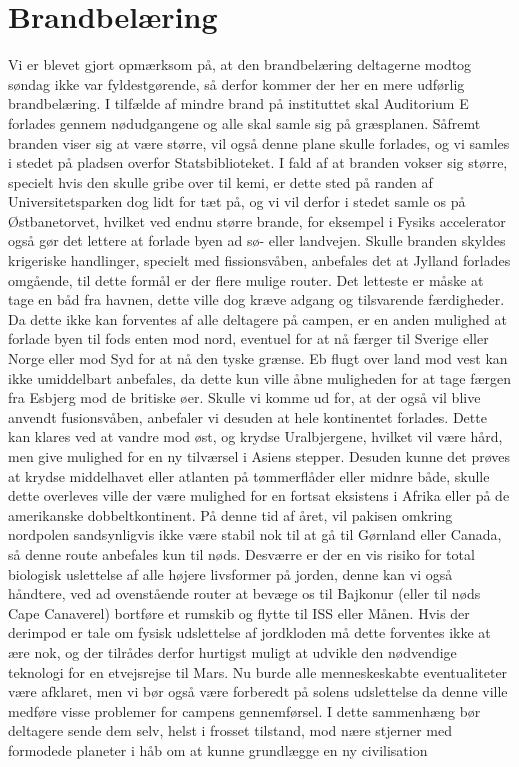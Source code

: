 

\begin{minipage}[b]{0.95\linewidth}
\begin{minipage}[t]{0.47\textwidth}
\vspace{3mm}
\section*{Brandbelæring}
Vi er blevet gjort opmærksom på, at den brandbelæring deltagerne modtog søndag ikke var fyldestgørende, så derfor kommer der her en mere udførlig brandbelæring. I tilfælde af mindre brand på instituttet skal Auditorium E forlades gennem nødudgangene og alle skal samle sig på græsplanen. Såfremt branden viser sig at være større, vil også denne plane skulle forlades, og vi samles i stedet på pladsen overfor Statsbiblioteket. I fald af at branden vokser sig større, specielt hvis den skulle gribe over til kemi, er dette sted på randen af Universitetsparken dog lidt for tæt på, og vi vil derfor i stedet samle os på Østbanetorvet, hvilket ved endnu større brande, for eksempel i Fysiks accelerator også gør det lettere at forlade byen ad sø- eller landvejen. Skulle branden skyldes krigeriske handlinger, specielt med fissionsvåben, anbefales det at Jylland forlades omgående, til dette formål er der flere mulige router. Det letteste er måske at tage en båd fra havnen, dette ville dog kræve adgang og tilsvarende færdigheder. Da dette ikke kan forventes af alle deltagere på campen, er en anden mulighed at forlade byen til fods enten mod nord, eventuel for at nå færger til Sverige eller Norge eller mod Syd for at nå den tyske grænse. Eb flugt over land mod vest kan ikke umiddelbart anbefales, da dette kun ville åbne muligheden for at tage færgen fra Esbjerg mod de britiske øer. Skulle vi komme ud for, at der også vil blive anvendt fusionsvåben, anbefaler vi desuden at hele kontinentet forlades. Dette kan klares ved at vandre mod øst, og krydse Uralbjergene, hvilket vil være hård, men give mulighed for en ny tilværsel i Asiens stepper. Desuden kunne det prøves at krydse middelhavet eller atlanten på tømmerflåder eller midnre både, skulle dette overleves ville der være mulighed for en fortsat eksistens i Afrika eller på de amerikanske dobbeltkontinent. På denne tid af året, vil pakisen omkring nordpolen sandsynligvis ikke være stabil nok til at gå til Gørnland eller Canada, så denne route anbefales kun til nøds. Desværre er der en vis risiko for total biologisk uslettelse af alle højere livsformer på jorden, denne kan vi også håndtere, ved ad ovenstående router at bevæge os til Bajkonur (eller til nøds Cape Canaverel) bortføre et rumskib og flytte til ISS eller Månen. Hvis der derimpod er tale om fysisk udslettelse af jordkloden må dette forventes ikke at ære nok, og der tilrådes derfor hurtigst muligt at udvikle den nødvendige teknologi for en etvejsrejse til Mars. Nu burde alle menneskeskabte eventualiteter være afklaret, men vi bør også være forberedt på solens udslettelse da denne ville medføre visse problemer for campens gennemførsel. I dette sammenhæng bør deltagere sende dem selv, helst i frosset tilstand, mod nære stjerner med formodede planeter i håb om at kunne grundlægge en ny civilisation 
\end{minipage}
\end{minipage}
